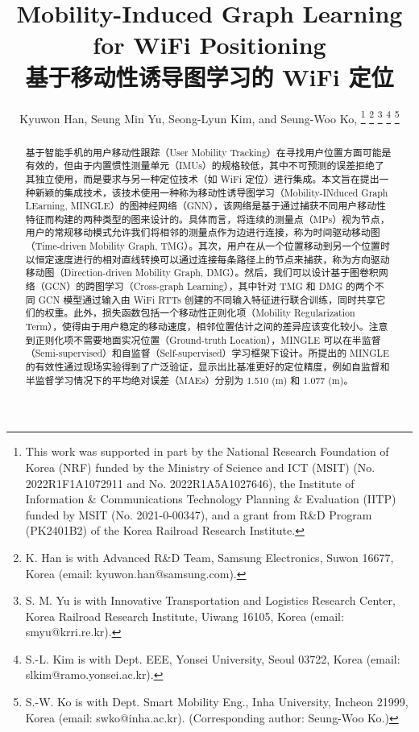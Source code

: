 \documentclass[journal]{IEEEtran}
\begin{document}

\title{Mobility-Induced Graph Learning for WiFi Positioning\\
\Large 基于移动性诱导图学习的 WiFi 定位}

\author{Kyuwon Han, Seung Min Yu, Seong-Lyun Kim, and Seung-Woo Ko, 
\thanks{This work was supported in part by the National Research Foundation of Korea (NRF) funded by the Ministry of Science and ICT (MSIT) (No. 2022R1F1A1072911 and No. 2022R1A5A1027646), the Institute of Information \& Communications Technology Planning \& Evaluation (IITP) funded by MSIT (No. 2021-0-00347), and a grant from R\&D Program (PK2401B2) of the Korea Railroad Research Institute.}
\thanks{K. Han is with Advanced R\&D Team, Samsung Electronics, Suwon 16677, Korea (email: kyuwon.han@samsung.com).}
\thanks{S. M. Yu is with Innovative Transportation and Logistics Research Center, Korea Railroad Research Institute, Uiwang 16105, Korea (email: smyu@krri.re.kr).}
\thanks{S.-L. Kim is with Dept. EEE, Yonsei University, Seoul 03722, Korea (email: slkim@ramo.yonsei.ac.kr).}
\thanks{S.-W. Ko is with Dept. Smart Mobility Eng., Inha University, Incheon 21999, Korea (email: swko@inha.ac.kr). (Corresponding author: Seung-Woo Ko.)}
}

\maketitle

\begin{abstract}
基于智能手机的用户移动性跟踪（User Mobility Tracking）在寻找用户位置方面可能是有效的，但由于内置惯性测量单元（IMUs）的规格较低，其中不可预测的误差拒绝了其独立使用，而是要求与另一种定位技术（如 WiFi 定位）进行集成。本文旨在提出一种新颖的集成技术，该技术使用一种称为移动性诱导图学习（Mobility-INduced Graph LEarning, MINGLE）的图神经网络（GNN），该网络是基于通过捕获不同用户移动性特征而构建的两种类型的图来设计的。具体而言，将连续的测量点（MPs）视为节点，用户的常规移动模式允许我们将相邻的测量点作为边进行连接，称为时间驱动移动图（Time-driven Mobility Graph, TMG）。其次，用户在从一个位置移动到另一个位置时以恒定速度进行的相对直线转换可以通过连接每条路径上的节点来捕获，称为方向驱动移动图（Direction-driven Mobility Graph, DMG）。然后，我们可以设计基于图卷积网络（GCN）的跨图学习（Cross-graph Learning），其中针对 TMG 和 DMG 的两个不同 GCN 模型通过输入由 WiFi RTTs 创建的不同输入特征进行联合训练，同时共享它们的权重。此外，损失函数包括一个移动性正则化项（Mobility Regularization Term），使得由于用户稳定的移动速度，相邻位置估计之间的差异应该变化较小。注意到正则化项不需要地面实况位置（Ground-truth Location），MINGLE 可以在半监督（Semi-supervised）和自监督（Self-supervised）学习框架下设计。所提出的 MINGLE 的有效性通过现场实验得到了广泛验证，显示出比基准更好的定位精度，例如自监督和半监督学习情况下的平均绝对误差（MAEs）分别为 1.510 (m) 和 1.077 (m)。
\end{abstract}
\end{document}
